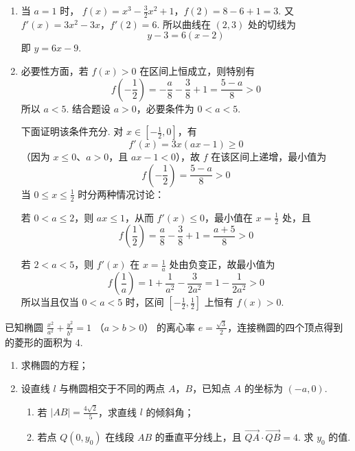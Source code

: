\begin{solution}
\begin{enumerate}
\item 当 \(a=1\) 时，
\(f(x)=x^3-\frac32x^2+1\)，\(f(2)=8-6+1=3\).
又
\(f'(x)=3x^2-3x\)，\(f'(2)=6\).
所以曲线在 \((2,3)\) 处的切线为
\[
y-3=6(x-2)
\]
即 \(y=6x-9\).

\item 必要性方面，若 \(f(x)>0\) 在区间上恒成立，则特别有
\[
f\left(-\frac12\right)
=-\frac a8-\frac38+1
=\frac{5-a}{8}>0
\]
所以 \(a<5\). 结合题设 \(a>0\)，必要条件为 \(0<a<5\).

下面证明该条件充分. 对 \(x\in[-\frac12,0]\)，有
\[
 f'(x)=3x(ax-1)\geqslant0
\]
（因为 \(x\leqslant0\)、\(a>0\)，且 \(ax-1<0\)），故 \(f\) 在该区间上递增，最小值为
\[
f\left(-\frac12\right)=\frac{5-a}{8}>0
\]
当 \(0\leqslant x\leqslant\frac12\) 时分两种情况讨论：

若 \(0<a\leqslant2\)，则 \(ax\leqslant1\)，从而 \(f'(x)\leqslant0\)，最小值在 \(x=\frac12\) 处，且
\[
f\left(\frac12\right)=\frac a8-\frac38+1=\frac{a+5}{8}>0
\]

若 \(2<a<5\)，则 \(f'(x)\) 在 \(x=\frac{1}{a}\) 处由负变正，故最小值为
\[
f\left(\frac1a\right)
=1+\frac1{a^2}-\frac{3}{2a^2}
=1-\frac1{2a^2}>0
\]
所以当且仅当 \(0<a<5\) 时，区间 \([-\frac12,\frac12]\) 上恒有 \(f(x)>0\).
\end{enumerate}
\end{solution}

\begin{problem}
已知椭圆 \(\frac{x^2}{a^2} + \frac{y^2}{b^2} = 1\) （\(a > b > 0\)） 的离心率 \(e = \frac{\sqrt{3}}{2}\)，连接椭圆的四个顶点得到的菱形的面积为 4.

\begin{enumerate}
\item 求椭圆的方程；
\item 设直线 \(l\) 与椭圆相交于不同的两点 \(A\)，\(B\)，已知点 \(A\) 的坐标为 \((-a,0)\).

\begin{enumerate}
\item 若 \(|AB| = \frac{4\sqrt{2}}{5}\)，求直线 \(l\) 的倾斜角；
\item 若点 \(Q(0,y_0)\) 在线段 \(AB\) 的垂直平分线上，且 \(\overrightarrow{QA} \cdot \overrightarrow{QB} = 4\). 求 \(y_0\) 的值.
\end{enumerate}
\end{enumerate}
\end{problem}

